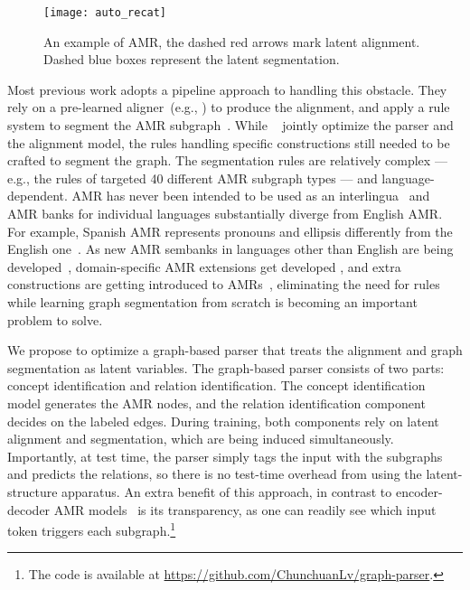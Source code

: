 \documentclass[11pt]{article}
\begin{document}
\begin{figure}[t!]
\centering
\texttt{[image: auto\_recat]}
\vspace{-2ex}
\caption{An example of AMR, the dashed red arrows mark latent alignment. Dashed blue boxes represent the latent segmentation.} \label{fig:amr-example}
\end{figure}

Most previous work adopts a pipeline approach to handling this obstacle. They rely on a pre-learned aligner~(e.g., \cite{pourdamghani-etal-2014-aligning}) to produce the alignment, and apply a rule system to segment the AMR subgraph~\cite{Flanigan2014ADG,Werling2015RobustSG,Damonte2017AnIP,Ballesteros2017AMRPU,peng-etal-2015-synchronous,Artzi2015BroadcoverageCS,Groschwitz2018AMRDP}. While ~ jointly optimize the parser and the alignment model, the rules handling specific constructions  still needed to be crafted to segment the graph. 
The segmentation rules are relatively complex --- e.g.,  the rules of  targeted 40 different
AMR subgraph types --- and language-dependent. AMR has never been intended to be used as an interlingua~\cite{Banarescu13abstractmeaning,damonte-18} 
and AMR banks for individual languages substantially diverge from English AMR. For example, Spanish AMR represents
pronouns and ellipsis differently from the English one~\cite{migueles-abraira-etal-2018-annotating}.
As new AMR sembanks in languages other than English are being  developed~\cite{anchieta-pardo-2018-towards,song-etal-2020-construct},
 domain-specific AMR extensions get developed \cite{bonn-etal-2020-spatial,bonial-etal-2020-dialogue},
 and extra constructions are getting introduced to AMRs~\cite{bonial-etal-2018-abstract}, eliminating the need for rules while learning graph segmentation from scratch is becoming an important problem to solve. 

We propose to optimize a graph-based parser that treats the alignment and graph segmentation  as latent variables. The graph-based parser consists of two parts: concept identification and relation identification. The concept identification model generates the AMR nodes, and the relation identification component decides on the labeled edges. During training, both components rely on latent alignment and segmentation, which are being induced simultaneously.  Importantly, at test time, the parser simply tags the input with the subgraphs and predicts the relations, so there is no test-time overhead from using the latent-structure apparatus. An extra benefit of this approach, in contrast to encoder-decoder AMR models~\cite{Konstas2017NeuralAS,Noord2017NeuralSP,Cai2020AMRPV} is its transparency, as one can readily see which input token triggers each subgraph.\footnote{The code is available at \url{https://github.com/ChunchuanLv/graph-parser}.}
\end{document}
